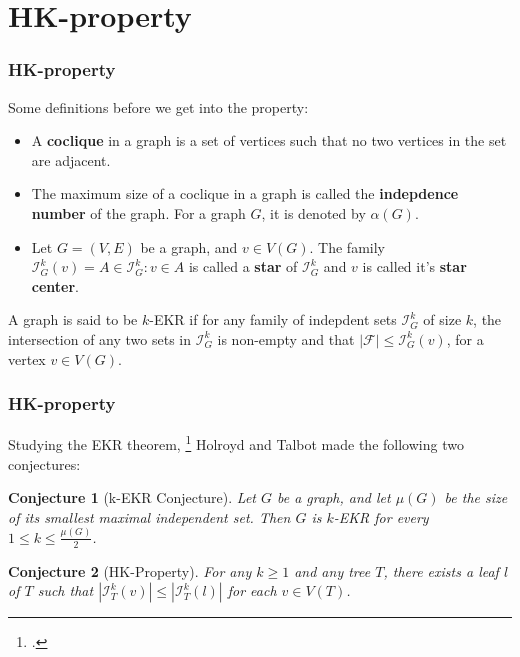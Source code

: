 \documentclass[10pt,]{beamer}
\theoremstyle{mystyle}
\newtheorem*{conjecture}{Conjecture}
\begin{document}
\section{HK-property}
\begin{frame}\frametitle{HK-property}
    Some definitions before we get into the property:

    \begin{definition}[Cocliques]
        \begin{itemize}
            \item A \textbf{coclique} in a graph is a set of vertices such that no two vertices in the set are adjacent.
            \item The maximum size of a coclique in a graph is called the \textbf{indepdence number} of the graph. For a graph $G$, it is denoted by $\alpha(G)$.
        \end{itemize}
    \end{definition}

    \begin{definition}
        \begin{itemize}
            \item Let $G = (V, E)$ be a graph, and $v \in V(G)$. The family $\mathcal{I}^k_G(v) = {A \in \mathcal{I}^k_G : v \in A}$ is called a \textbf{star} of $\mathcal{I}^k_G$ and $v$ is called it's \textbf{star center}.
        \end{itemize}
    \end{definition}

    \begin{definition}
        A graph is said to be $k$-EKR if for any family of indepdent sets $\mathcal{I}^k_G$ of size $k$, the intersection of any two sets in $\mathcal{I}^k_G$ is non-empty and that $|\mathcal{F}| \leq \mathcal{I}^k_G(v)$, for a vertex $v \in V(G)$.
    \end{definition}
\end{frame}

\begin{frame}\frametitle{HK-property}
    Studying the EKR theorem, \footcite{HOLROYD2005165} Holroyd and Talbot made the following two conjectures:
    \begin{conjecture}[k-EKR Conjecture]
        Let $G$ be a graph, and let $\mu(G)$ be the size of its smallest maximal independent set. Then $G$ is $k$-EKR for every $1 \leq k \leq \frac{\mu(G)}{2}$.
    \end{conjecture}
    \begin{conjecture}[HK-Property]
        For any $k \geq 1$ and any tree $T$, there exists a leaf $l$ of $T$ such that $|\mathcal{I}^k_T(v)| \leq |\mathcal{I}^k_T(l)|$ for each $v \in V(T)$.
    \end{conjecture}
\end{frame}
\end{document}
